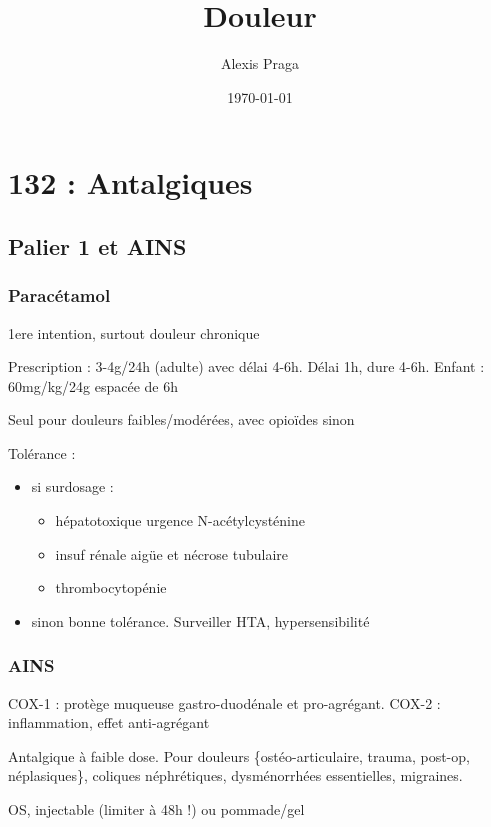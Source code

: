 \documentclass[11pt]{article}
\author{Alexis Praga}
\date{\today}
\title{Douleur}
\begin{document}
\maketitle
\tableofcontents



\section{132 : Antalgiques}
\label{sec:orgac0e11f}
\subsection{Palier 1 et AINS}
\label{sec:org4191979}
\subsubsection{Paracétamol}
\label{sec:orgd489fcf}
1ere intention, surtout douleur chronique

Prescription : 3-4g/24h (adulte) avec délai 4-6h. Délai 1h, dure 4-6h. Enfant : 60mg/kg/24g
espacée de 6h 

Seul pour douleurs faibles/modérées, avec opioïdes sinon

Tolérance :
\begin{itemize}
\item si surdosage : 
\begin{itemize}
\item hépatotoxique \thus urgence \skull \thus N-acétylcysténine
\item insuf rénale aigüe et nécrose tubulaire
\item thrombocytopénie
\end{itemize}
\item sinon bonne tolérance. Surveiller HTA, hypersensibilité
\end{itemize}

\subsubsection{AINS}
\label{sec:org43ed138}
COX-1 : protège muqueuse gastro-duodénale et pro-agrégant. COX-2 : inflammation,
effet anti-agrégant

Antalgique à faible dose. Pour douleurs \{ostéo-articulaire, trauma, post-op,
néplasiques\}, coliques néphrétiques, dysménorrhées essentielles, migraines.

OS, injectable (limiter à 48h !) ou pommade/gel
\end{document}
